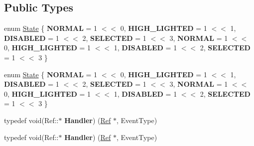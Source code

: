 \subsection*{Public Types}
\begin{DoxyCompactItemize}
\item 
enum \hyperlink{classControl_a89e9598cd785841ac91cff3c4798c469}{State} \{ \newline
{\bfseries N\+O\+R\+M\+AL} = 1 $<$$<$ 0, 
{\bfseries H\+I\+G\+H\+\_\+\+L\+I\+G\+H\+T\+ED} = 1 $<$$<$ 1, 
{\bfseries D\+I\+S\+A\+B\+L\+ED} = 1 $<$$<$ 2, 
{\bfseries S\+E\+L\+E\+C\+T\+ED} = 1 $<$$<$ 3, 
\newline
{\bfseries N\+O\+R\+M\+AL} = 1 $<$$<$ 0, 
{\bfseries H\+I\+G\+H\+\_\+\+L\+I\+G\+H\+T\+ED} = 1 $<$$<$ 1, 
{\bfseries D\+I\+S\+A\+B\+L\+ED} = 1 $<$$<$ 2, 
{\bfseries S\+E\+L\+E\+C\+T\+ED} = 1 $<$$<$ 3
 \}
\item 
enum \hyperlink{classControl_a89e9598cd785841ac91cff3c4798c469}{State} \{ \newline
{\bfseries N\+O\+R\+M\+AL} = 1 $<$$<$ 0, 
{\bfseries H\+I\+G\+H\+\_\+\+L\+I\+G\+H\+T\+ED} = 1 $<$$<$ 1, 
{\bfseries D\+I\+S\+A\+B\+L\+ED} = 1 $<$$<$ 2, 
{\bfseries S\+E\+L\+E\+C\+T\+ED} = 1 $<$$<$ 3, 
\newline
{\bfseries N\+O\+R\+M\+AL} = 1 $<$$<$ 0, 
{\bfseries H\+I\+G\+H\+\_\+\+L\+I\+G\+H\+T\+ED} = 1 $<$$<$ 1, 
{\bfseries D\+I\+S\+A\+B\+L\+ED} = 1 $<$$<$ 2, 
{\bfseries S\+E\+L\+E\+C\+T\+ED} = 1 $<$$<$ 3
 \}
\item 
\mbox{\label{classControl_a1ced3b5c18cb6e7fbe0ac07b89459281}} 
typedef void(Ref\+::$\ast$ {\bfseries Handler}) (\hyperlink{classRef}{Ref} $\ast$, Event\+Type)
\item 
\mbox{\label{classControl_a1ced3b5c18cb6e7fbe0ac07b89459281}} 
typedef void(Ref\+::$\ast$ {\bfseries Handler}) (\hyperlink{classRef}{Ref} $\ast$, Event\+Type)
\end{DoxyCompactItemize}
